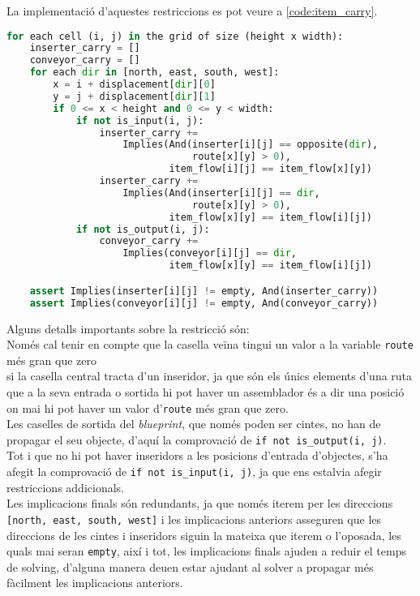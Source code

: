 La implementació d'aquestes restriccions es pot veure a \ref{code:item_carry}.

\begin{lstlisting}[language=Python, caption=Item Carry, label=code:item_carry]
for each cell (i, j) in the grid of size (height x width):
    inserter_carry = []
    conveyor_carry = []
    for each dir in [north, east, south, west]:
        x = i + displacement[dir][0]
        y = j + displacement[dir][1]
        if 0 <= x < height and 0 <= y < width:
            if not is_input(i, j):
                inserter_carry += 
                    Implies(And(inserter[i][j] == opposite(dir),
                                route[x][y] > 0),
                            item_flow[i][j] == item_flow[x][y])
                inserter_carry += 
                    Implies(And(inserter[i][j] == dir,
                                route[x][y] > 0),
                            item_flow[x][y] == item_flow[i][j])
            if not is_output(i, j):
                conveyor_carry += 
                    Implies(conveyor[i][j] == dir,
                            item_flow[x][y] == item_flow[i][j])

    assert Implies(inserter[i][j] != empty, And(inserter_carry))
    assert Implies(conveyor[i][j] != empty, And(conveyor_carry))
\end{lstlisting}

Alguns detalls importants sobre la restricció són:\\
Només cal tenir en compte que la casella veïna tingui un valor a la variable \lstinline{route} més gran que zero \\ si la casella central tracta d'un inseridor, ja que són els únics elements d'una ruta que a la seva entrada o sortida hi pot haver un assemblador és a dir una posició on mai hi pot haver un valor d'\lstinline{route} més gran que zero.\\

Les caselles de sortida del \textit{blueprint}, que només poden ser cintes, no han de propagar el seu objecte, d'aquí la comprovació de \lstinline{if not is_output(i, j)}.\\

Tot i que no hi pot haver inseridors a les posicions d'entrada d'objectes, s'ha afegit la comprovació de \lstinline{if not is_input(i, j)}, ja que ens estalvia afegir restriccions addicionals.\\

Les implicacions finals són redundants, ja que només iterem per les direccions \lstinline{[north, east, south, west]} i les implicacions anteriors asseguren que les direccions de les cintes i inseridors siguin la mateixa que iterem o l'oposada, les quals mai seran \lstinline{empty}, així i tot, les implicacions finals ajuden a reduir el temps de solving, d'alguna manera deuen estar ajudant al solver a propagar més fàcilment les implicacions anteriors.

